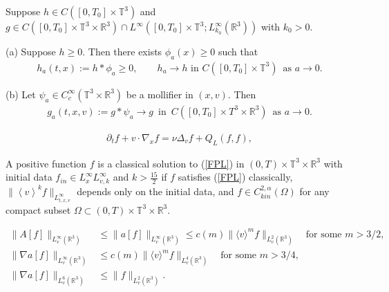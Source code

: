 \documentclass[10pt,a4paper]{amsart}
\newcommand{\Ni}{\noindent}
\newcommand{\R}{\mathbb R}
\newcommand{\T}{\mathbb{T}}
\newcommand{\vint}[1]{\left\langle#1\right\rangle}
\begin{document}
\begin{lemma} \label{lem:kernels}
Suppose $h \in C([0, T_0] \times \T^3)$ and $g \in C([0, T_0] \times \T^3 \times \R^3) \cap L^\infty([0, T_0] \times \T^3; L^\infty_{k_0}(\R^3))$ with $k_0 > 0$. 

\Ni (a) Suppose $h \geq 0$. Then there exists $\phi_a(x) \geq 0$ such that 
\begin{align*}
 h_a(t, x) := h * \phi_a \geq 0, 
\qquad
 h_a \to h \,\, \text{in} \,\,
C([0, T_0] \times \T^3)
\,\,\,
\text{as $a \to 0$}.
\end{align*}

\Ni (b) Let $\psi_a \in C^\infty_c(\T^3 \times \R^3)$ be a mollifier in $(x, v)$. Then 
\begin{align*}
 g_a (t, x, v)
:= g \ast \psi_a 
\to g \,\,\,
\text{in} \,\,\,
C([0, T_0] \times T^3 \times \R^3) \,\,\,
\text{as $a \to 0$.}
\end{align*}
\end{lemma}

\begin{align}\label{FPL}
\partial_t f + v \cdot \nabla_x f = \nu \Delta_v f  + Q_L ( f,f),  
\end{align}

\begin{definition} \label{D_existence}
A positive function $f$ is a classical solution to (\ref{FPL}) in $(0,T) \times \T^3 \times \R^{3}$ with initial data $f_{in} \in L^{\infty}_x L^\infty_{v,k}$ and $k>\frac{15}{2}$ if $f$ satisfies (\ref{FPL}) classically, $ \|\vint{v}^k f\|_{L^\infty_{t,x,v}}$ depends only on the initial data, and $ f \in C_{kin}^{2,\alpha}(\Omega)$ for any compact subset $\Omega \subset (0, T) \times \T^3 \times \mathbb{R}^{3}$.  
\end{definition} 

\begin{align}\label{A_sup}
\| A[f]\|_{L^\infty_v(\mathbb{R}^3)} & \le \| a[f]\|_{L^\infty_v(\mathbb{R}^3)}  \le c(m)  \|   \langle v \rangle^{m}f\|_{L^2_v(\mathbb{R}^3)} \quad \textrm{for some $m>3/2$, } \\
\| \nabla a [f]\|_{L^\infty_v(\mathbb{R}^3)}&  \le c(m) \|   \langle v \rangle^{m}f\|_{L^4_v(\mathbb{R}^3)} \quad \textrm{for some $m>3/4$, } \label{nablaA_sup}\\
\| \nabla a [f]\|_{L^6_v(\mathbb{R}^3)} & \le   \| f\|_{L^2_v(\mathbb{R}^3)}.\label{nablaa_L6} 
\end{align}
\end{document}
